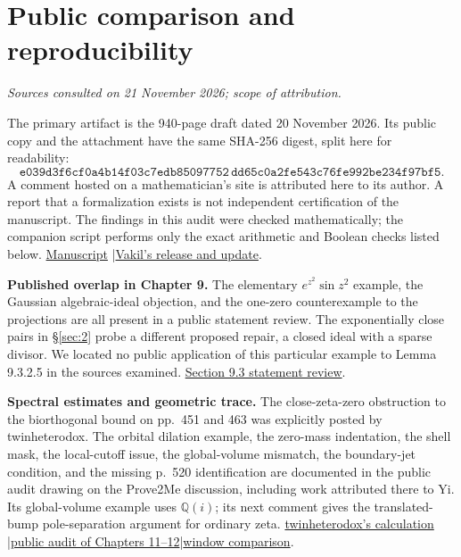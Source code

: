 \documentclass[11pt,reqno]{amsart}
\numberwithin{equation}{section}
\newcommand{\Q}{\mathbb Q}\newcommand{\R}{\mathbb R}\newcommand{\C}{\mathbb C}\newcommand{\Z}{\mathbb Z}
\newcommand{\prior}{\href{https://github.com/mccorvie/riemann-masullo/issues/2469\#issuecomment-7057757662}{public audit of Chapters 11--12}}
\begin{document}
\section{Public comparison and reproducibility}\label{sec:13}

\textit{Sources consulted on 21 November 2026; scope of attribution.}\par
The primary artifact is the 940-page draft dated 20 November 2026. Its public copy and the attachment have the same SHA-256 digest, split here for readability:
\[
\texttt{e039d3f6cf0a4b14f03c7edb85097752}\,
\texttt{dd65c0a2fe543c76fe992be234f97bf5}.
\]
A comment hosted on a mathematician's site is attributed here to its author. A report that a formalization exists is not independent certification of the manuscript. The findings in this audit were checked mathematically; the companion script performs only the exact arithmetic and Boolean checks listed below. \href{https://math216.wordpress.com/wp-content/uploads/2026/11/the-music-of-the-primes.pdf}{Manuscript} \enspace|\enspace \href{https://math216.wordpress.com/2026/11/20/hurried-announcement-alessandro-masullo-grh/}{Vakil's release and update}.

\textbf{Published overlap in Chapter 9.} The elementary \(e^{z^2}\sin z^2\) example, the Gaussian algebraic-ideal objection, and the one-zero counterexample to the projections are all present in a public statement review. The exponentially close pairs in \S\ref{sec:2} probe a different proposed repair, a closed ideal with a sparse divisor. We located no public application of this particular example to Lemma 9.3.2.5 in the sources examined. \href{https://github.com/mccorvie/riemann-masullo/pull/2437\#issuecomment-7057600557}{Section 9.3 statement review}.

\textbf{Spectral estimates and geometric trace.} The close-zeta-zero obstruction to the biorthogonal bound on pp.~451 and 463 was explicitly posted by twinheterodox. The orbital dilation example, the zero-mass indentation, the shell mask, the local-cutoff issue, the global-volume mismatch, the boundary-jet condition, and the missing p.~520 identification are documented in the public audit drawing on the Prove2Me discussion, including work attributed there to Yi. Its global-volume example uses \(\Q(i)\); its next comment gives the translated-bump pole-separation argument for ordinary zeta. \href{https://terrytao.wordpress.com/2026/11/20/unforced-euler-singularity-unforced-navier-stokes-singularity-and-the-generalized-riemann-hypothesis/\#comment-699655}{twinheterodox's calculation} \enspace|\enspace \prior \enspace|\enspace \href{https://github.com/mccorvie/riemann-masullo/issues/2469\#issuecomment-7057757877}{window comparison}.
\end{document}
